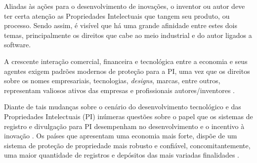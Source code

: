 Aliadas  às  ações  para  o  desenvolvimento  de  inovações, o inventor ou autor deve ter certa atenção as Propriedades Intelectuais que tangem seu produto, ou processo.  Sendo assim, é visível que há uma grande afinidade entre estes dois temas, principalmente os direitos que cabe ao meio industrial e do autor ligados a software. 

A crescente interação comercial,  financeira  e  tecnológica  entre  a  economia  e  seus  agentes  exigem  padrões  modernos  de  proteção  para  a  PI,  uma  vez  que  os  direitos sobre os nomes empresariais, tecnologias, \textit{designs}, marcas, entre outros, representam valiosos ativos das empresas e profissionais autores/inventores \cite{sherwood_propriedade_1992}. 


Diante de tais mudanças sobre o cenário do desenvolvimento tecnológico e das Propriedades Intelectuais (PI) inúmeras questões sobre o papel que os sistemas de registro e divulgação para PI desempenham no desenvolvimento e o incentivo à inovação \cite{segala_os_2016}. Os países que apresentam uma economia mais forte, dispõe de um sistema de proteção de propriedade mais robusto e confiável, concomitantemente, uma maior quantidade de registros e depósitos das mais variadas finalidades \cite{mueller_universidades_2014}.



